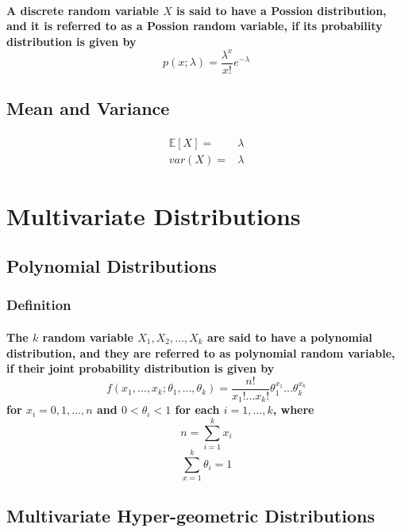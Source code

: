 \documentclass[titlepage]{article}
\begin{document}
            \paragraph{
                A discrete random variable $X$ is said to have a Possion distribution, and it is referred to as a Possion random variable, if its probability distribution is given by
                $$p(x;\lambda)=\frac{\lambda^x}{x!}e^{-\lambda}$$
            }
        \subsection*{Mean and Variance}  
            \paragraph{
                \begin{equation*}
                    \begin{split}
                        \mathbb{E}[X]=&\lambda\\
                        var(X)=&\lambda
                    \end{split}
                \end{equation*}
            }
    \section{Multivariate Distributions}
        \subsection{Polynomial Distributions}
            \subsubsection*{Definition}
                \paragraph{
                    The $k$ random variable $X_1,X_2,...,X_k$ are said to have a polynomial distribution, and they are referred to as polynomial random variable, if their joint probability distribution is given by
                    $$f(x_1,...,x_k;\theta_1,...,\theta_k)=\frac{n!}{x_1!...x_k!}\theta_1^{x_1}...\theta_k^{x_k}$$
                    for $x_i=0,1,...,n$ and $0<\theta_i<1$ for each $i=1,...,k$, where 
                    $$n=\sum_{i=1}^kx_i$$
                    $$\sum_{x=1}^k\theta_i=1$$
                }
        \subsection{Multivariate Hyper-geometric Distributions}
\end{document}
